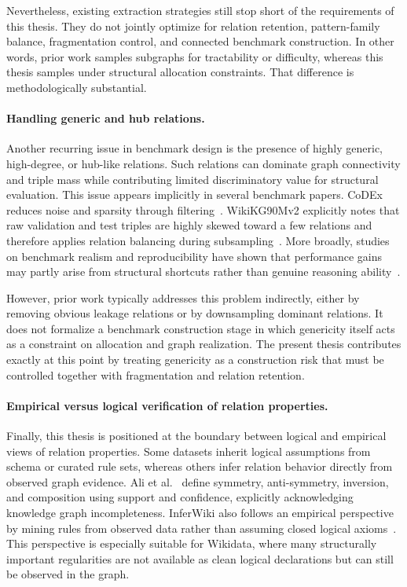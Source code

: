 \documentclass[12pt,a4paper]{article}
\begin{document}
Nevertheless, existing extraction strategies still stop short of the requirements of this thesis. They do not jointly optimize for relation retention, pattern-family balance, fragmentation control, and connected benchmark construction. In other words, prior work samples subgraphs for tractability or difficulty, whereas this thesis samples under structural allocation constraints. That difference is methodologically substantial.

\paragraph{Handling generic and hub relations.}
Another recurring issue in benchmark design is the presence of highly generic, high-degree, or hub-like relations. Such relations can dominate graph connectivity and triple mass while contributing limited discriminatory value for structural evaluation. This issue appears implicitly in several benchmark papers. CoDEx reduces noise and sparsity through filtering~\cite{safavi2020codex}. WikiKG90Mv2 explicitly notes that raw validation and test triples are highly skewed toward a few relations and therefore applies relation balancing during subsampling~\cite{ogb_wikikg90mv2}. More broadly, studies on benchmark realism and reproducibility have shown that performance gains may partly arise from structural shortcuts rather than genuine reasoning ability~\cite{akrami2018reevaluating,akrami2020realistic,sun2020reevaluation,ali2022bringing}.

However, prior work typically addresses this problem indirectly, either by removing obvious leakage relations or by downsampling dominant relations. It does not formalize a benchmark construction stage in which genericity itself acts as a constraint on allocation and graph realization. The present thesis contributes exactly at this point by treating genericity as a construction risk that must be controlled together with fragmentation and relation retention.

\paragraph{Empirical versus logical verification of relation properties.}
Finally, this thesis is positioned at the boundary between logical and empirical views of relation properties. Some datasets inherit logical assumptions from schema or curated rule sets, whereas others infer relation behavior directly from observed graph evidence. Ali et al.~\cite{ali2022bringing} define symmetry, anti-symmetry, inversion, and composition using support and confidence, explicitly acknowledging knowledge graph incompleteness. InferWiki also follows an empirical perspective by mining rules from observed data rather than assuming closed logical axioms~\cite{cao2021inferwiki}. This perspective is especially suitable for Wikidata, where many structurally important regularities are not available as clean logical declarations but can still be observed in the graph.
\end{document}
